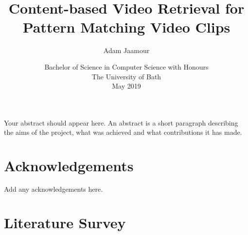 \documentclass[11pt,openright,twoside,a4paper]{report}
\title{Content-based Video Retrieval for Pattern Matching Video Clips}
\author{Adam Jaamour}
\date{Bachelor of Science in Computer Science with Honours\\The University of Bath\\May 2019}
\begin{document}
\setcounter{page}{0}

\maketitle
\newpage

\newpage

\newpage

\abstract
Your abstract should appear here.  An abstract is a short
paragraph describing the aims of the project, what was
achieved and what contributions it has made.
\newpage

\tableofcontents
\newpage
\listoffigures
\newpage
\listoftables
\newpage

\chapter*{Acknowledgements}
Add any acknowledgements here.
\newpage

\setcounter{page}{1}

% 

\chapter{Literature Survey}




\end{document}
